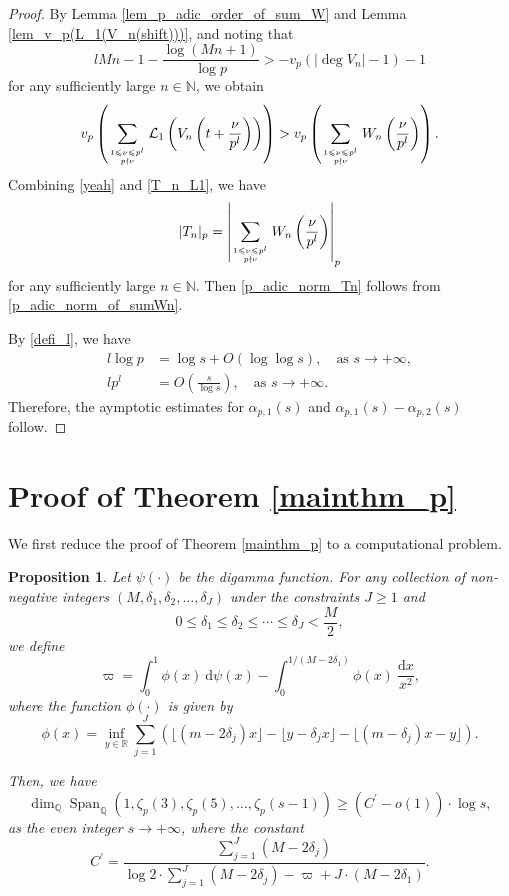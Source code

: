 \documentclass[12pt]{article}
\newtheorem{proposition}[theorem]{Proposition}
\numberwithin{equation}{section}
\begin{document}
\begin{proof}
By Lemma \ref{lem_p_adic_order_of_sum_W} and Lemma \ref{lem_v_p(L_1(V_n(shift)))}, and noting that
\[ lMn -1 -\frac{\log(Mn+1)}{\log p} > -v_p(|\deg V_n|-1) - 1 \]
for any sufficiently large $n \in \mathbb{N}$, we obtain
\begin{equation}\label{yeah}
	v_p\left(  \sum_{1 \leqslant \nu \leqslant p^l \atop p \nmid \nu}  \mathcal{L}_1\left( V_n\left(t+\frac{\nu}{p^l}\right) \right)  \right) > v_p\left( \sum_{1 \leqslant \nu \leqslant p^l \atop p \nmid \nu} W_n\left( \frac{\nu}{p^l} \right) \right).
\end{equation}
Combining \eqref{yeah} and \eqref{T_n_L1}, we have
\[ |T_n|_p = \left| \sum_{1 \leqslant \nu \leqslant p^l \atop p \nmid \nu} W_n\left( \frac{\nu}{p^l} \right) \right|_p   \]
for any sufficiently large $n \in \mathbb{N}$. Then \eqref{p_adic_norm_Tn} follows from \eqref{p_adic_norm_of_sumWn}. 

By \eqref{defi_l}, we have
\begin{align*}
	l\log p &= \log s + O(\log\log s), \quad\text{as~} s\to +\infty, \\
	lp^{l} &= O\left( \frac{s}{\log s} \right), \quad\text{as~} s\to +\infty.
\end{align*}
Therefore, the aymptotic estimates for $\alpha_{p,1}(s)$ and $\alpha_{p,1}(s) -\alpha_{p,2}(s)$ follow.
\end{proof}


\section{Proof of Theorem \ref{mainthm_p}}\label{Sect_proo_p}

We first reduce the proof of Theorem \ref{mainthm_p} to a computational problem.

\begin{proposition}\label{prop_p}
Let $\psi(\cdot)$ be the digamma function. For any collection of non-negative integers $(M,\delta_1,\delta_2,\ldots,\delta_J)$ under the constraints $J \geqslant 1$ and
\[ 	0 \leqslant \delta_1 \leqslant \delta_2 \leqslant \cdots \leqslant \delta_J < \frac{M}{2}, \]
we define
\[ \varpi = \int_{0}^{1} \phi(x)~\mathrm{d}\psi(x) - \int_{0}^{1/(M-2\delta_1)} \phi(x)~\frac{\mathrm{d}x}{x^2},   \]
where the function $\phi(\cdot)$ is given by
\[ \phi(x) = \inf_{y \in \mathbb{R}} \sum_{j=1}^{J}  \left( \lfloor(m-2\delta_j)x\rfloor - \lfloor y-\delta_j x \rfloor - \lfloor (m-\delta_j)x - y \rfloor \right). \]
	
Then, we have
\[ \dim_{\mathbb{Q}}\operatorname{Span}_{\mathbb{Q}}\left( 1,\zeta_p(3),\zeta_p(5),\ldots,\zeta_p(s-1) \right) \geqslant (C^{\prime}-o(1)) \cdot \log s, \]
as the even integer $s \to +\infty$, where the constant 
\begin{equation}\label{defi_C^prime}
C^{\prime} = \frac{\sum_{j=1}^{J} (M-2\delta_j) }{\log2 \cdot \sum_{j=1}^{J}(M-2\delta_j)  - \varpi  + J \cdot (M-2\delta_1)}. 
\end{equation} 
\end{proposition}
\end{document}
